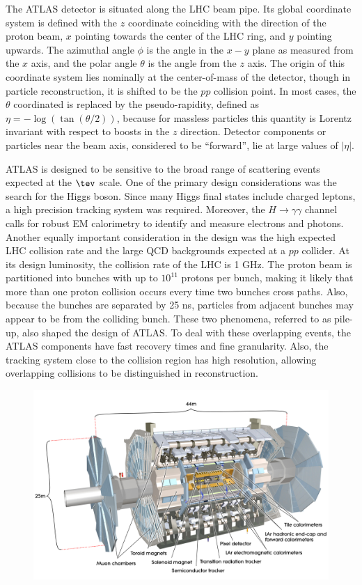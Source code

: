 
The ATLAS detector is situated along the LHC beam pipe. Its global
coordinate
system is defined with the $z$ coordinate coinciding with the
direction of
the proton beam, $x$ pointing towards the center of the
LHC ring, and $y$ pointing upwards. The azimuthal angle $\phi$ is the
angle in the $x-y$ plane as measured from the $x$ axis, and the polar
angle $\theta$ is the angle from the $z$ axis. The origin of this
coordinate system lies nominally at the center-of-mass of the
detector, though in particle reconstruction, it is shifted to be the
$pp$ collision point. In most cases, the $\theta$ coordinated is
replaced by the pseudo-rapidity, defined as $\eta = -\log (\tan
(\theta/2))$, because for massless particles this quantity is Lorentz
invariant with respect to boosts in the $z$ direction. Detector
components or particles near the beam axis, considered to be
``forward'', lie at large values of $|\eta|$.

ATLAS is designed to be sensitive to the broad range of scattering
events expected at the $\tev$ scale. One of the primary design
considerations was the search for the Higgs boson. Since many Higgs
final states include charged leptons, a high precision tracking system
was required. Moreover, the $H\rightarrow{\gamma\gamma}$ channel calls
for robust EM calorimetry to identify and measure electrons and
photons. Another equally important consideration in the design was the
high expected LHC collision rate and the large QCD backgrounds
expected at a $pp$ collider. At its design luminosity, the collision
rate of the LHC is 1 GHz. The proton beam is partitioned into
 bunches with up to $10^{11}$ protons per
bunch, making it likely that more than one proton collision occurs
every time two bunches cross paths. Also, because the bunches are
separated by 25 ns, particles from adjacent bunches may appear to be
from the colliding bunch. These two phenomena, referred to as pile-up,
also shaped the design of ATLAS. To deal with these overlapping
events, the ATLAS components have fast recovery times and fine
granularity. Also, the
tracking system close to the collision region has high resolution,
allowing overlapping collisions to be distinguished in
reconstruction.

\begin{figure}[ht]
    \centering
    \includegraphics[width=1.0\textwidth]{fig/detector/full_atlas.pdf}
    \caption[]{}
\label{chap:detector:fig:full_atlas}
\end{figure}

